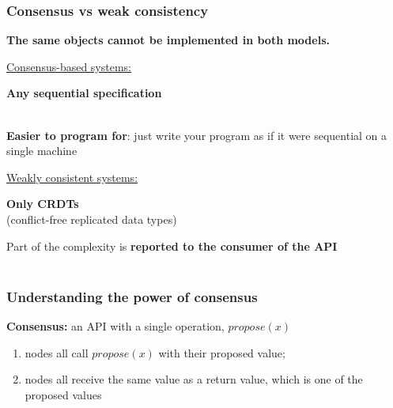 \documentclass[aspectratio=169]{beamer}
\begin{document}
\begin{frame}
	\frametitle{Consensus vs weak consistency}
	\begin{center}
		\textbf{The same objects cannot be implemented in both models.}
	\end{center}
	\vspace{2em}

	\hspace{1em}
	\begin{minipage}{6.5cm}
		\underline{Consensus-based systems:}

		\vspace{1em}

		\textbf{Any sequential specification}\\~

		\vspace{1em}
		\textbf{Easier to program for}: just write your program as if it were sequential on a single machine

	\end{minipage}
	\hfill
	\begin{minipage}{6.5cm}
		\underline{Weakly consistent systems:}

		\vspace{1em}
		
		\textbf{Only CRDTs}\\(conflict-free replicated data types)

		\vspace{1em}
		Part of the complexity is \textbf{reported to the consumer of the API}\\~
	\end{minipage}
	\hspace{1em}
\end{frame}

\begin{frame}
	\frametitle{Understanding the power of consensus}
	\textbf{Consensus:} an API with a single operation, $propose(x)$
	\begin{enumerate}
		\item nodes all call $propose(x)$ with their proposed value;
		\item nodes all receive the same value as a return value, which is one of the proposed values
	\end{enumerate}
	\vspace{1em}
	
	\vspace{1em}

\end{frame}
\end{document}
